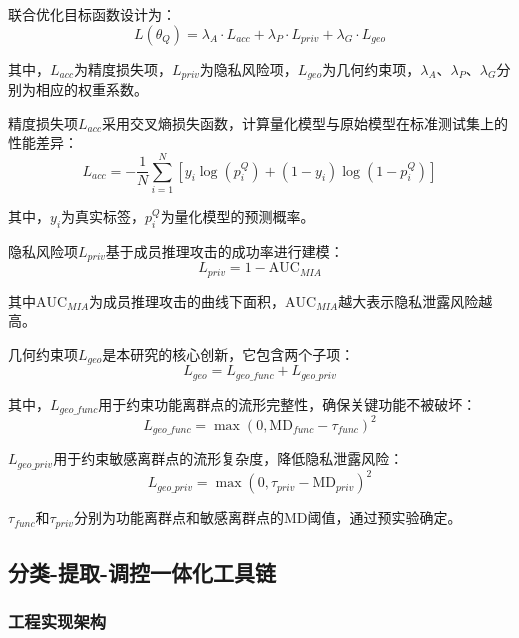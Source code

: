 联合优化目标函数设计为：
\begin{equation}
L(\theta_Q) = \lambda_A \cdot L_{acc} + \lambda_P \cdot L_{priv} + \lambda_G \cdot L_{geo}
\end{equation}

其中，$L_{acc}$为精度损失项，$L_{priv}$为隐私风险项，$L_{geo}$为几何约束项，$\lambda_A$、$\lambda_P$、$\lambda_G$分别为相应的权重系数。

精度损失项$L_{acc}$采用交叉熵损失函数，计算量化模型与原始模型在标准测试集上的性能差异：
\begin{equation}
L_{acc} = -\frac{1}{N}\sum_{i=1}^N [y_i \log(p_i^Q) + (1-y_i) \log(1-p_i^Q)]
\end{equation}

其中，$y_i$为真实标签，$p_i^Q$为量化模型的预测概率。

隐私风险项$L_{priv}$基于成员推理攻击的成功率进行建模：
\begin{equation}
L_{priv} = 1 - \text{AUC}_{MIA}
\end{equation}

其中$\text{AUC}_{MIA}$为成员推理攻击的曲线下面积，$\text{AUC}_{MIA}$越大表示隐私泄露风险越高。

几何约束项$L_{geo}$是本研究的核心创新，它包含两个子项：
\begin{equation}
L_{geo} = L_{geo\_func} + L_{geo\_priv}
\end{equation}

其中，$L_{geo\_func}$用于约束功能离群点的流形完整性，确保关键功能不被破坏：
\begin{equation}
L_{geo\_func} = \max(0, \text{MD}_{func} - \tau_{func})^2
\end{equation}

$L_{geo\_priv}$用于约束敏感离群点的流形复杂度，降低隐私泄露风险：
\begin{equation}
L_{geo\_priv} = \max(0, \tau_{priv} - \text{MD}_{priv})^2
\end{equation}

$\tau_{func}$和$\tau_{priv}$分别为功能离群点和敏感离群点的MD阈值，通过预实验确定。

\subsection{分类-提取-调控一体化工具链}

\subsubsection{工程实现架构}

